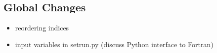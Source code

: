 %
%
%

\subsection{Global Changes}
\begin{itemize}
    \item reordering indices
    \item input variables in setrun.py (discuss Python interface to Fortran)
\end{itemize}

